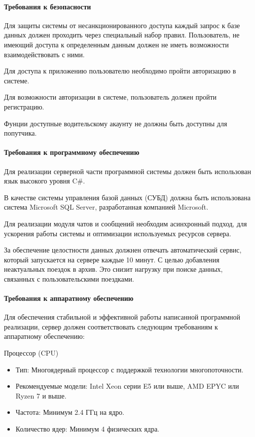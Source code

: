 \paragraph{Требования к безопасности}
Для защиты системы от несанкционированного доступа каждый запрос к базе данных должен проходить через специальный набор правил. Пользователь, не имеющий доступа к определенным данным должен не
иметь возможности взаимодействовать с ними.

Для доступа к приложению пользователю необходимо пройти авторизацию в системе.

Для возможности авторизации в системе, пользователь должен пройти регистрацию.

Фунции доступные водительскому акаунту не должны быть доступны для попутчика.

\paragraph{Требования к программному обеспечению}

Для реализации серверной части программной системы должен быть использован язык высокого уровня C\#.

В качестве системы управления базой данных (СУБД) должна быть использована система Microsoft SQL Server, разработанная компанией Microsoft.

Для реализации модуля чатов и сообщений необходим асинхронный подход, для ускорения работы системы и оптимизации используемых ресурсов сервера.

За обеспечение целостности данных должнен отвечать автоматический сервис, который запускается на сервере каждые 10 минут. С целью добавления неактуальных поездок в архив. Это снизит нагрузку при поиске данных, связанных с пользовательскими поездками.

\paragraph{Требования к аппаратному обеспечению}

Для обеспечения стабильной и эффективной работы написанной программной реализации, сервер должен соответствовать следующим требованиям к аппаратному обеспечению:

Процессор (CPU)
\begin{itemize}
	\item Тип: Многоядерный процессор с поддержкой технологии многопоточности.
	\item Рекомендуемые модели: Intel Xeon серии E5 или выше, AMD EPYC или Ryzen 7 и выше.
	\item Частота: Минимум 2.4 ГГц на ядро.
	\item Количество ядер: Минимум 4 физических ядра.
\end{itemize}

